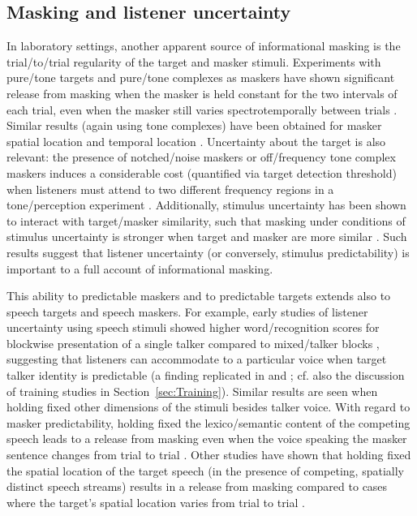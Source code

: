 \subsection{Masking and listener uncertainty\label{sec:uncertainty}}
In laboratory settings, another apparent source of informational masking is the trial\-/to\-/trial regularity of the target and masker stimuli.  Experiments with pure\-/tone targets and pure\-/tone complexes as maskers have shown significant release from masking when the masker is held constant for the two intervals of each trial, even when the masker still varies spectrotemporally between trials \citep{NeffGreen1987, NeffCallahan1988}.  Similar results (again using tone complexes) have been obtained for masker spatial location \citep{FanEtAl2008} and temporal location \citep{BoninoLeibold2008}.  Uncertainty about the target is also relevant: the presence of notched\-/noise maskers or off\-/frequency tone complex maskers induces a considerable cost (quantified via target detection threshold) when listeners must attend to two different frequency regions in a tone\-/perception experiment \citep{KiddEtAl2008}.  Additionally, stimulus uncertainty has been shown to interact with target\-/masker similarity, such that masking under conditions of stimulus uncertainty is stronger when target and masker are more similar \citep{DurlachEtAl2003b}.  Such results suggest that listener uncertainty (or conversely, stimulus predictability) is important to a full account of informational masking.

This ability to  predictable maskers and  to predictable targets extends also to speech targets and speech maskers.  For example, early studies of listener uncertainty using speech stimuli showed higher word\-/recognition scores for blockwise presentation of a single talker compared to mixed\-/talker blocks \citep{SommersEtAl1994}, suggesting that listeners can accommodate to a particular voice when target talker identity is predictable (a finding replicated in \citealt{BrungartSimpson2004} and \citealt{EricsonEtAl2004}; cf. also the discussion of training studies in Section~\ref{sec:Training}).  Similar results are seen when holding fixed other dimensions of the stimuli besides talker voice.  With regard to masker predictability, holding fixed the lexico\-/semantic content of the competing speech leads to a release from masking even when the voice speaking the masker sentence changes from trial to trial \citep{BrungartSimpson2004}.  Other studies have shown that holding fixed the spatial location of the target speech (in the presence of competing, spatially distinct speech streams) results in a release from masking compared to cases where the target’s spatial location varies from trial to trial \citep{EricsonEtAl2004, KiddEtAl2005a}.  

